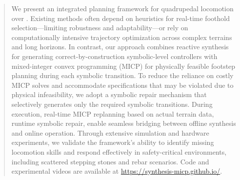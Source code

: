 \begin{abstract}
We present an integrated planning framework for quadrupedal locomotion over .
Existing methods often depend on heuristics for real-time foothold selection---limiting robustness and adaptability---or rely on computationally intensive trajectory optimization across complex terrains and long horizons. In contrast, our approach combines reactive synthesis for generating correct-by-construction symbolic-level controllers with mixed-integer convex programming (MICP) for physically feasible footstep planning during each symbolic transition. To reduce the reliance on costly MICP solves and accommodate specifications that may be violated due to physical infeasibility, we adopt a symbolic repair mechanism that selectively generates only the required symbolic transitions. During execution, real-time MICP replanning based on actual terrain data, runtime symbolic repair,  enable seamless bridging between offline synthesis and online operation. Through extensive simulation and hardware experiments, we validate the framework's ability to identify missing locomotion skills and respond effectively in safety-critical environments, including scattered stepping stones and rebar scenarios. Code and experimental videos are available at \url{https://synthesis-micp.github.io/}.
\end{abstract}